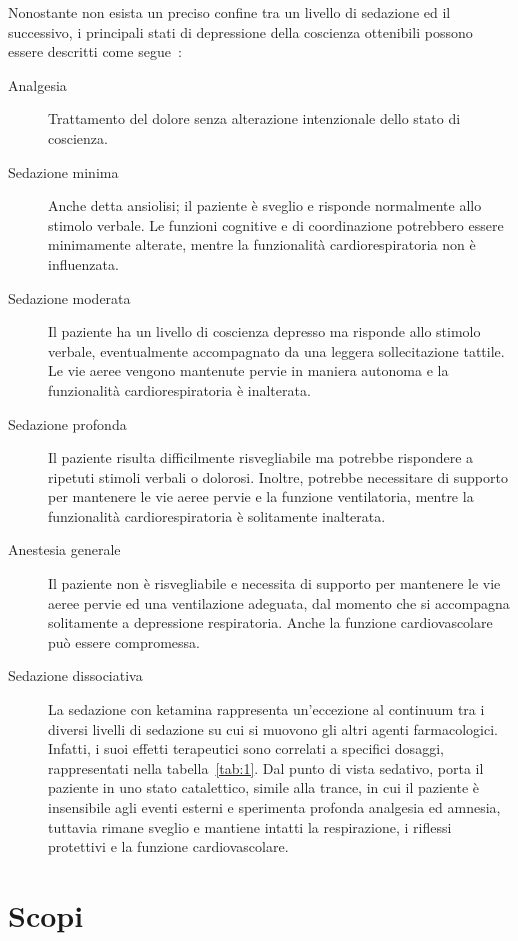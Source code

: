 Nonostante non esista un preciso confine tra un livello di sedazione ed il successivo, i principali stati di depressione della coscienza ottenibili possono essere descritti come segue~\cite{Statpearls, Berkenbosch2015}:

\begin{description}
\item[Analgesia] Trattamento del dolore senza alterazione intenzionale dello stato di coscienza.
\item[Sedazione minima] Anche detta ansiolisi; il paziente è sveglio e risponde normalmente allo stimolo verbale. Le funzioni cognitive e di coordinazione potrebbero essere minimamente alterate, mentre la funzionalità cardiorespiratoria non è influenzata.
\item[Sedazione moderata] Il paziente ha un livello di coscienza depresso ma risponde allo stimolo verbale, eventualmente accompagnato da una leggera sollecitazione tattile. Le vie aeree vengono mantenute pervie in maniera autonoma e la funzionalità cardiorespiratoria è inalterata. 
\item[Sedazione profonda] Il paziente risulta difficilmente risvegliabile ma potrebbe rispondere a ripetuti stimoli verbali o dolorosi. Inoltre, potrebbe necessitare di supporto per mantenere le vie aeree pervie e la funzione ventilatoria, mentre la funzionalità cardiorespiratoria è solitamente inalterata. 
\item[Anestesia generale] Il paziente non è risvegliabile e necessita di supporto per mantenere le vie aeree pervie ed una ventilazione adeguata, dal momento che si accompagna solitamente a depressione respiratoria. Anche la funzione cardiovascolare può essere compromessa. 
\item[Sedazione dissociativa] La sedazione con ketamina rappresenta un'eccezione al continuum tra i diversi livelli di sedazione su cui si muovono gli altri agenti farmacologici. Infatti, i suoi effetti terapeutici sono correlati a specifici dosaggi, rappresentati nella tabella~\ref{tab:1}. Dal punto di vista sedativo, porta il paziente in uno stato catalettico, simile alla trance, in cui il paziente è insensibile agli eventi esterni e sperimenta profonda analgesia ed amnesia, tuttavia rimane sveglio e mantiene intatti la respirazione, i riflessi protettivi e la funzione cardiovascolare.

\end{description}

\section{Scopi}

